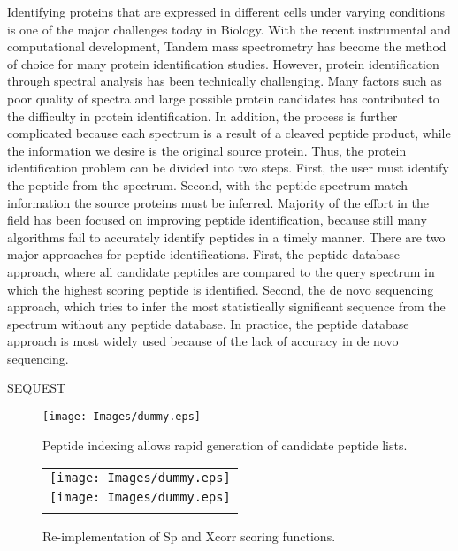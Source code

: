 \documentclass{bioinfo}
\begin{document}
Identifying proteins that are expressed in different cells under varying conditions is one of the major challenges today in Biology. With the recent instrumental and computational development, Tandem mass spectrometry has become the method of choice for many protein identification studies. However, protein identification through spectral analysis has been technically challenging. Many factors such as poor quality of spectra and large possible protein candidates has contributed to the difficulty in protein identification. In addition, the process is further complicated because each spectrum is a result of a cleaved peptide product, while the information we desire is the original source protein. Thus, the protein identification problem can be divided into two steps. First, the user must identify the peptide from the spectrum. Second, with the peptide spectrum match information the source proteins must be inferred. Majority of the effort in the field has been focused on improving peptide identification, because still many algorithms fail to accurately identify peptides in a timely manner.
	There are two major approaches for peptide identifications. First, the peptide database approach, where all candidate peptides are compared to the query spectrum in which the highest scoring peptide is identified. Second, the de novo sequencing approach, which tries to infer the most statistically significant sequence from the spectrum without any peptide database. In practice, the peptide database approach is most widely used because of the lack of accuracy in de novo sequencing.

SEQUEST\citep{eng:approach}


\begin{figure}
  \centering
  \texttt{[image: Images/dummy.eps]}
  \caption{Peptide indexing allows rapid generation of candidate peptide
  lists.}
  \label{figure:indexing}
\end{figure}

\begin{figure}
  \centering
  \begin{tabular}{c}
  \texttt{[image: Images/dummy.eps]} \\
  \texttt{[image: Images/dummy.eps]} \\
  \caption{Re-implementation of Sp and Xcorr scoring functions.}
  \label{figure:indexing}
  \end{tabular}
\end{figure}
\end{document}
